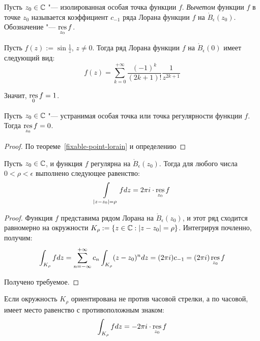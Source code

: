 \begin{definition}
	Пусть $z_0 \in \mathbb{C}$ "--- изолированная особая точка функции $f$. \textit{Вычетом} функции $f$ в точке $z_0$ называется коэффициент $c_{-1}$ ряда Лорана функции $f$ на $\mathring B_\epsilon(z_0)$. Обозначение "--- $\operatorname*{res}\limits_{z_0}f$.
\end{definition}

\begin{unnecessary}
    \begin{example}
    	Пусть $f(z) := \sin{\frac 1z}$, $z \ne 0$. Тогда ряд Лорана функции $f$ на $\mathring B_\epsilon(0)$ имеет следующий вид:
    	\[f(z) = \sum_{k = 0}^{+\infty}\frac{(-1)^k}{(2k+1)!}\frac1{z^{2k+1}}\]
    	
    	Значит, $\operatorname*{res}\limits_0{f} = 1$.
    \end{example}

    \begin{proposition}
    	Пусть $z_0 \in \mathbb{C}$ "--- устранимая особая точка или точка регулярности функции $f$. Тогда $\operatorname*{res}\limits_{z_0}f = 0$.
    \end{proposition}
    
    \begin{proof}
    	По теореме~\ref{fixable-point-lorain} и определению\qedhere
    \end{proof}
\end{unnecessary}

\begin{proposition}
	Пусть $z_0 \in \mathbb{C}$, и функция $f$ регулярна на $\mathring B_\epsilon(z_0)$. Тогда для любого числа $0 < \rho < \epsilon$ выполнено следующее равенство:
	\[\int\limits_{|z - z_0| = \rho}fdz = 2\pi i \cdot \operatorname*{res}\limits_{z_0}f\]
\end{proposition}

\begin{proof}
	Функция $f$ представима рядом Лорана на $\mathring B_\epsilon(z_0)$, и этот ряд сходится равномерно на окружности $K_\rho:= \{z \in \mathbb{C}: |z - z_0| = \rho\}$. Интегрируя почленно, получим:
	\[\int_{K_\rho}fdz = \sum\limits_{n = -\infty}^{+\infty}c_n\int_{K_\rho}(z-z_0)^ndz = (2\pi i)c_{-1} = (2\pi i)\operatorname*{res}_{z_0}f\]
	
	Получено требуемое.
\end{proof}

\begin{note}
	Если окружность $K_\rho$ ориентирована не против часовой стрелки, а по часовой, имеет место равенство с противоположным знаком:
	\[\int_{K_\rho}fdz = -2\pi i \cdot \operatorname*{res}_{z_0}f\]
\end{note}

